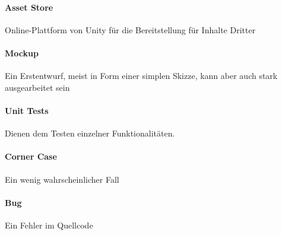 \paragraph*{Asset Store} Online-Plattform von Unity für die Bereitstellung für Inhalte Dritter 
\paragraph*{Mockup} Ein Erstentwurf, meist in Form einer simplen Skizze, kann aber auch stark ausgearbeitet sein
\paragraph*{Unit Tests} Dienen dem Testen einzelner Funktionalitäten.
\paragraph*{Corner Case} Ein wenig wahrscheinlicher Fall 
\paragraph*{Bug} Ein Fehler im Quellcode 